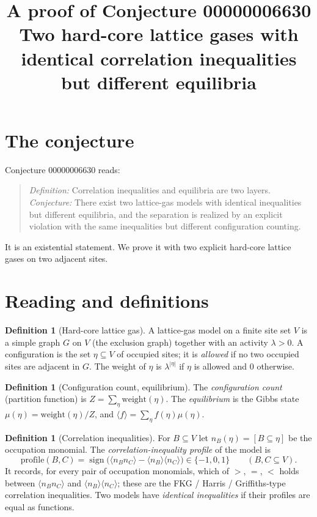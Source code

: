 \documentclass[11pt]{article}
\title{A proof of Conjecture 00000006630\\[2pt]
\large Two hard-core lattice gases with identical correlation inequalities but different equilibria}
\date{}
\theoremstyle{definition}
\newtheorem{definition}[theorem]{Definition}
\theoremstyle{remark}
\renewcommand{\_}{\oldus\allowbreak}
\begin{document}
\sloppy
\maketitle

\section{The conjecture}

Conjecture 00000006630 reads:

\begin{quote}
\emph{Definition:} Correlation inequalities and equilibria are two layers. \emph{Conjecture:} There
exist two lattice-gas models with identical inequalities but different equilibria, and the
separation is realized by an explicit violation with the same inequalities but different
configuration counting.
\end{quote}

It is an existential statement. We prove it with two explicit hard-core lattice gases on two
adjacent sites.

\section{Reading and definitions}

\begin{definition}[Hard-core lattice gas]
A lattice-gas model on a finite site set $V$ is a simple graph $G$ on $V$ (the exclusion graph)
together with an activity $\lambda>0$. A configuration is the set $\eta\subseteq V$ of occupied
sites; it is \emph{allowed} if no two occupied sites are adjacent in $G$. The weight of $\eta$ is
$\lambda^{|\eta|}$ if $\eta$ is allowed and $0$ otherwise.
\end{definition}

\begin{definition}[Configuration count, equilibrium]
The \emph{configuration count} (partition function) is $Z=\sum_{\eta}\mathrm{weight}(\eta)$. The
\emph{equilibrium} is the Gibbs state $\mu(\eta)=\mathrm{weight}(\eta)/Z$, and
$\langle f\rangle=\sum_\eta f(\eta)\mu(\eta)$.
\end{definition}

\begin{definition}[Correlation inequalities]
For $B\subseteq V$ let $n_B(\eta)=[B\subseteq\eta]$ be the occupation monomial. The
\emph{correlation-inequality profile} of the model is
\[
  \mathrm{profile}(B,C)=\operatorname{sign}\bigl(\langle n_Bn_C\rangle-\langle n_B\rangle\langle
  n_C\rangle\bigr)\in\{-1,0,1\}\qquad(B,C\subseteq V).
\]
It records, for every pair of occupation monomials, which of $>$, $=$, $<$ holds between
$\langle n_Bn_C\rangle$ and $\langle n_B\rangle\langle n_C\rangle$; these are the FKG / Harris /
Griffiths-type correlation inequalities. Two models have \emph{identical inequalities} if their
profiles are equal as functions.
\end{definition}
\end{document}
